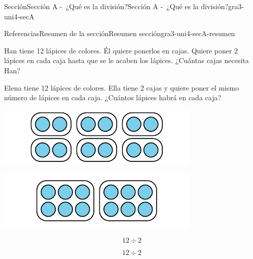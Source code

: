 \documentclass[twoside,10pt,]{article}
\begin{document}
\begin{sectionptx}{Sección}{Sección A -~¿Qué es la división?}{}{Sección A -~¿Qué es la división?}{}{}{gra3-uni4-secA}
\begin{references-subsection}{Referencias}{Resumen de la sección}{}{Resumen sección}{}{}{gra3-uni4-secA-resumen}
\begin{sidebyside}{2}{0.025}{0.025}{0.05}
\begin{sbspanel}{0.45}%
Han tiene 12 lápices de colores. Él quiere ponerlos en cajas. Quiere poner 2 lápices en cada caja hasta que se le acaben los lápices. ¿Cuántas cajas necesita Han?%
\end{sbspanel}%
\begin{sbspanel}{0.45}%
\par
Elena tiene 12 lápices de colores. Ella tiene 2 cajas y quiere poner el mismo número de lápices en cada caja. ¿Cuántos lápices habrá en cada caja?%
\end{sbspanel}%
\end{sidebyside}%
\begin{sidebyside}{2}{0.025}{0.025}{0.05}%
\begin{sbspanel}{0.45}%
\includegraphics[width=\linewidth]{external/svg-source/tikz-file-147695.pdf}
\end{sbspanel}%
\begin{sbspanel}{0.45}%
\includegraphics[width=\linewidth]{external/svg-source/tikz-file-147696.pdf}
\end{sbspanel}%
\end{sidebyside}%
\begin{sidebyside}{2}{0.025}{0.025}{0.05}%
\begin{sbspanel}{0.45}%
%
\begin{equation*}
12 \div 2
\end{equation*}
%
\end{sbspanel}%
\begin{sbspanel}{0.45}%
\par
%
\begin{equation*}
12 \div 2
\end{equation*}
%
\end{sbspanel}%
\end{sidebyside}%
\end{references-subsection}
\end{sectionptx}
\end{document}
